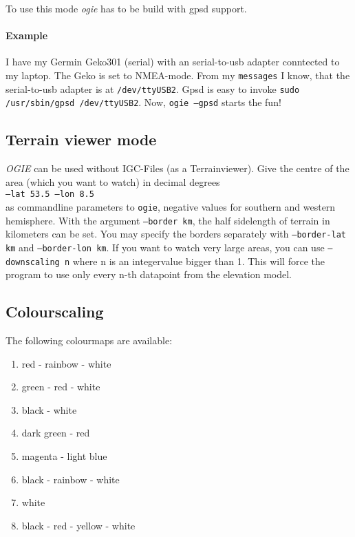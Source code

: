 To use this mode \emph{ogie} has to be build with gpsd support.

\paragraph{Example}
I have my Germin Geko301 (serial) with an serial-to-usb adapter conntected to my laptop. The Geko is set to NMEA-mode. From my \texttt{messages} I know, that the serial-to-usb adapter is at \texttt{/dev/ttyUSB2}. Gpsd is easy to invoke \texttt{sudo /usr/sbin/gpsd /dev/ttyUSB2}.
Now, \texttt{ogie --gpsd} starts the fun!









\subsection{Terrain viewer mode}

\emph{OGIE} can be used without IGC-Files (as a Terrainviewer).
Give the centre of the area (which you want to watch) in decimal degrees \\
\texttt{--lat 53.5  --lon 8.5} \\
as commandline parameters to \texttt{ogie}, negative values for southern and western  hemisphere.
With the argument \texttt{--border km}, the half sidelength of terrain in kilometers can be set. You may specify the borders separately with \texttt{--border-lat km}  and \texttt{--border-lon km}.
If you want to watch very large areas, you can use
\texttt{--downscaling n}
where n is an integervalue bigger than 1. This will force the program to use
only every n-th datapoint from the elevation model.



\subsection{Colourscaling}
\label{color}

The following colourmaps are available:

\begin{enumerate}
\item  red - rainbow - white
\item  green - red - white
\item  black - white
\item  dark green - red
\item  magenta - light blue
\item  black - rainbow - white
\item  white
\item  black - red - yellow - white
\end{enumerate}

